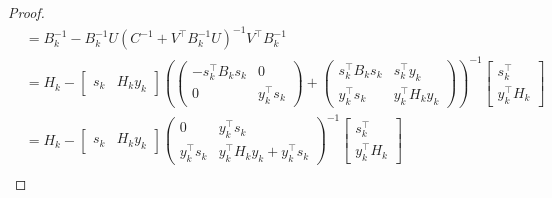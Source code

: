 \documentclass[0_main]{subfiles}
\begin{document}
\begin{proof}
\begin{align*}
                & = B_k^{-1}- B_k^{-1}U\left(C^{-1}+V^\top B_k^{-1}U\right)^{-1}V^\top B_k^{-1}                                                                                                                                                                                                                                                                                                                                                                                                                                                                                                                                                                                                                  \\
                & = H_k- \begin{bmatrix}s_k & H_k y_k\end{bmatrix} \left(\begin{pmatrix}- s_k^\top B_k s_k & 0                                                                                                                                                                                                                                            \\0    & y_k^\top s_k\end{pmatrix}+\begin{pmatrix}s_k^\top B_k s_k   & s_k^\top y_k      \\y_k^\top s_k & y_k^\top H_k y_k\end{pmatrix}\right)^{-1}\begin{bmatrix}s_k^\top \\ y_k^\top H_k\end{bmatrix}                                                                                                                                                \\
                & = H_k- \begin{bmatrix}s_k                                                                                                                             & H_k y_k\end{bmatrix}\begin{pmatrix}0                                                               & y_k^\top s_k                                                                                                                                                                                                                                          \\y_k^\top s_k       & y_k^\top H_k y_k + y_k^\top s_k\end{pmatrix}^{-1}\begin{bmatrix}s_k^\top                         \\     y_k^\top H_k\end{bmatrix}                    \\

\end{align*}
\end{proof}
\end{document}
